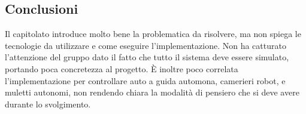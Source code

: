 \subsection{Conclusioni}
Il capitolato introduce molto bene la problematica da risolvere, ma non spiega le tecnologie da utilizzare e come eseguire l'implementazione.
Non ha catturato l'attenzione del gruppo dato il fatto che tutto il sistema deve essere simulato, portando poca concretezza al progetto.
È inoltre poco correlata l'implementazione per controllare auto a guida automona, camerieri robot, e muletti autonomi, non rendendo chiara la modalità di pensiero che si deve avere durante lo svolgimento.